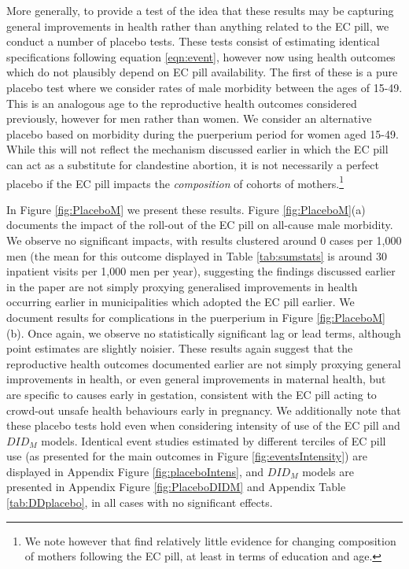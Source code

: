 \documentclass[12pt]{article}
\begin{document}
\begin{spacing}{1.9}
  More generally, to provide a test of the idea that these results may be capturing general improvements in health rather than anything related to the EC pill, we conduct a number of placebo tests.  These tests consist of estimating identical specifications following equation \ref{eqn:event}, however now using health outcomes which do not plausibly depend on EC pill availability.  The first of these is a pure placebo test where we consider rates of male morbidity between the ages of 15-49.  This is an analogous age to the reproductive health outcomes considered previously, however for men rather than women.  We consider an alternative placebo based on morbidity during the puerperium period for women aged 15-49.  While this will not reflect the mechanism discussed earlier in which the EC pill can act as a substitute for clandestine abortion, it is not necessarily a perfect placebo if the EC pill impacts the \emph{composition} of cohorts of mothers.\footnote{We note however that \citet{BentancorClarke2017} find relatively little evidence for changing composition of mothers following the EC pill, at least in terms of education and age.} 


  In Figure \ref{fig:PlaceboM} we present these results.  Figure \ref{fig:PlaceboM}(a) documents the impact of the roll-out of the EC pill on all-cause male morbidity.  We observe no significant impacts, with results clustered around 0 cases per 1,000 men (the mean for this outcome displayed in Table \ref{tab:sumstats} is around 30 inpatient visits per 1,000 men per year), suggesting the findings discussed earlier in the paper are not simply proxying generalised improvements in health occurring earlier in municipalities which adopted the EC pill earlier.  We document results for complications in the puerperium in Figure \ref{fig:PlaceboM}(b).  Once again, we observe no statistically significant lag or lead terms, although point estimates are slightly noisier.  These results again suggest that the reproductive health outcomes documented earlier are not simply proxying general improvements in health, or even general improvements in maternal health, but are specific to causes early in gestation, consistent with the EC pill acting to crowd-out unsafe health behaviours early in pregnancy.  We additionally note that these placebo tests hold even when considering intensity of use of the EC pill and $DID_M$ models.  Identical event studies estimated by different terciles of EC pill use (as presented for the main outcomes in Figure \ref{fig:eventsIntensity}) are displayed in Appendix Figure \ref{fig:placeboIntens}, and $DID_M$ models are presented in Appendix Figure \ref{fig:PlaceboDIDM} and Appendix Table \ref{tab:DDplacebo}, in all cases with no significant effects.  



\end{spacing}
\end{document}
